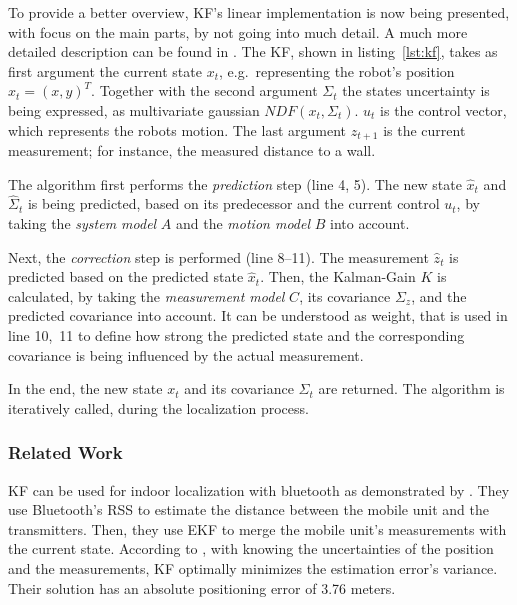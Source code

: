 
To provide a better overview, \ac{KF}'s linear implementation is now being presented, with focus on the main parts, by not going into much detail. A much more detailed description can be found in \citet{thrun:prob_robo}. 
The \ac{KF}, shown in listing~\ref{lst:kf}, takes as first argument the current state $x_t$, e.g.\ representing the robot's position $x_t = (x, y)^T$. Together with the second argument $\Sigma_t$ the states uncertainty is being expressed, as multivariate gaussian $NDF(x_t, \Sigma_t)$. $u_t$ is the control vector, which represents the robots motion. The last argument $z_{t+1}$ is the current measurement; for instance, the measured distance to a wall.

The algorithm first performs the \emph{prediction} step (line 4, 5). The new state $\hat{x}_t$ and $\hat{\Sigma}_t$ is being predicted, based on its predecessor and the current control $u_t$, by taking the \emph{system model} $A$ and the \emph{motion model} $B$ into account.

Next, the \emph{correction} step is performed (line 8--11). The measurement $\hat{z}_t$ is predicted based on the predicted state $\hat{x}_t$. Then, the Kalman-Gain $K$ is calculated, by taking the \emph{measurement model} $C$, its covariance $\Sigma_z$, and the predicted covariance into account. It can be understood as weight, that is used in line 10,~11 to define how strong the predicted  state and the corresponding covariance is being influenced by the actual measurement.

In the end, the new state $x_t$ and its covariance $\Sigma_t$ are returned. The algorithm is iteratively called, during the localization process.

\subsubsection*{Related Work}
\ac{KF} can be used for indoor localization with bluetooth as demonstrated by \citet{kotanen:exp_local_pos_bt}. They use Bluetooth's \ac{RSS} to estimate the distance between the mobile unit and the transmitters. Then, they use \acl{EKF} to merge the mobile unit's measurements with the current state. According to \cite{kotanen:exp_local_pos_bt}, with knowing the uncertainties of the position and the measurements, \ac{KF} optimally minimizes the estimation error's variance. Their solution has an absolute positioning error of 3.76 meters.

